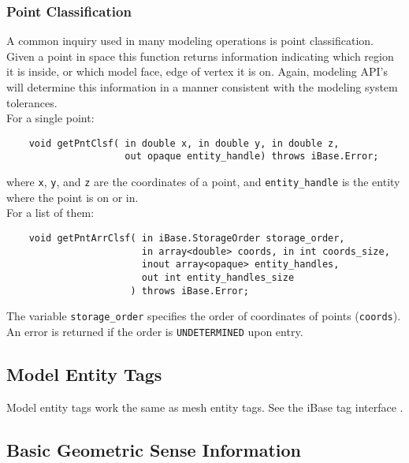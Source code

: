 \documentclass{article}
\begin{document}
\subsubsection{Point Classification}
A common inquiry used in many modeling operations is point 
classification. Given a point in space this function returns information 
indicating which region it is inside, or which model face, edge of 
vertex it is on. Again, modeling API's will determine this information 
in a manner consistent with the modeling system tolerances.\\

\hspace{-16pt}For a single point:
\begin{verbatim}
    void getPntClsf( in double x, in double y, in double z,
                     out opaque entity_handle) throws iBase.Error;    
\end{verbatim}
where {\tt x}, {\tt y}, and {\tt z} are the coordinates of a point, and
{\tt entity\_handle} is the entity where the point is on or in.\\

\hspace{-16pt}For a list of them:
\begin{verbatim}
    void getPntArrClsf( in iBase.StorageOrder storage_order,
      	                in array<double> coords, in int coords_size,
      	                inout array<opaque> entity_handles, 
                        out int entity_handles_size
      	              ) throws iBase.Error;
\end{verbatim}
The variable {\tt storage\_order} specifies the order of coordinates of
points ({\tt coords}). An error is returned if the order is {\tt UNDETERMINED} upon
entry.

\subsection{Model Entity Tags}
Model entity tags work the same as mesh entity tags. See 
the iBase tag interface  \cite{r27}.

\subsection{Basic Geometric Sense Information}
\end{document}
